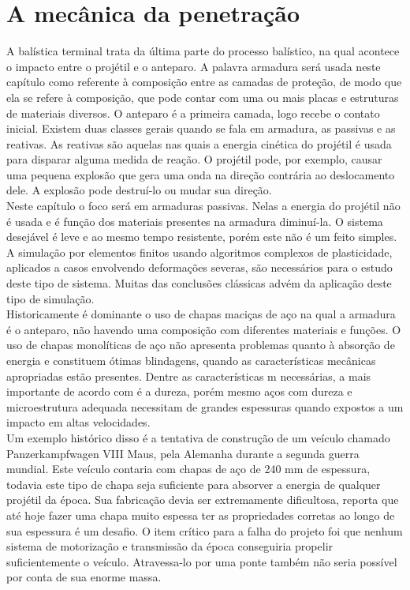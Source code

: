 \chapter{A mecânica da penetração}

A balística terminal trata da última parte do processo balístico, na qual acontece o impacto entre o projétil e o anteparo. A palavra armadura será usada neste capítulo como referente à composição entre as camadas de proteção, de modo que ela se refere à composição, que pode contar com uma ou mais placas e estruturas de materiais diversos. O anteparo é a primeira camada, logo recebe o contato inicial. Existem duas classes gerais quando se fala em armadura, as passivas e as reativas. As reativas são aquelas nas quais a energia cinética do projétil é usada para disparar alguma medida de reação. O projétil pode, por exemplo, causar uma pequena explosão que gera uma onda na direção contrária ao deslocamento dele. A explosão pode destruí-lo ou mudar sua direção. \\

Neste capítulo o foco será em armaduras passivas. Nelas a energia do projétil não é usada e é função dos materiais presentes na armadura diminuí-la. O sistema desejável é leve e ao mesmo tempo resistente, porém este não é um feito simples. A simulação por elementos finitos usando algoritmos complexos de plasticidade, aplicados a casos envolvendo  deformações severas, são necessários para o estudo deste tipo de sistema. Muitas das conclusões clássicas advém da aplicação deste tipo de simulação. \\
Historicamente é dominante o uso de chapas maciças de aço na qual a armadura é o anteparo, não havendo uma composição com diferentes materiais e funções. O uso de chapas monolíticas de aço não apresenta problemas quanto à absorção de energia e constituem ótimas blindagens, quando as características mecânicas apropriadas estão presentes. Dentre as características m necessárias, a mais importante de acordo com \cite{Crouch} é a dureza, porém mesmo aços com dureza e microestrutura adequada necessitam de grandes espessuras quando expostos a um impacto em altas velocidades. \\

Um exemplo histórico disso é a tentativa de construção de um veículo chamado Panzerkampfwagen VIII Maus, pela Alemanha durante a segunda guerra mundial. Este veículo contaria com chapas de aço de 240 mm de espessura, todavia este tipo de chapa seja suficiente para absorver a energia de qualquer projétil da época. Sua fabricação devia ser extremamente dificultosa, \cite{Crouch} reporta que até hoje fazer uma chapa muito espessa ter as propriedades corretas ao longo de sua espessura é um desafio. O item crítico para a falha do projeto foi que nenhum sistema de motorização e transmissão da época conseguiria propelir suficientemente o veículo. Atravessa-lo por uma ponte também não seria possível por conta de sua enorme massa.  \\

